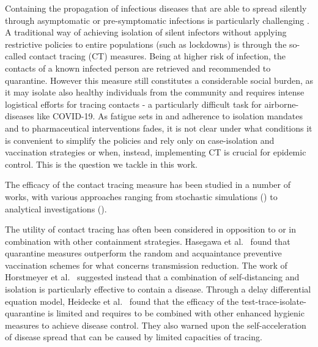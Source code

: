 \documentclass[aps,twocolumn,superscriptaddress,nofootinbib,pre,floatfix]{revtex4-1}
\begin{document}
Containing the propagation of infectious diseases that are able to
spread silently through asymptomatic or pre-symptomatic infections is
particularly challenging \cite{Fraser, Ferretti, Johansson, Li, Groendyke}.
A traditional way of achieving isolation of silent infectors without
applying restrictive policies to entire populations (such as lockdowns)
is through the so-called contact tracing (CT) measures.
Being at higher risk of infection, the contacts of a known infected
person are retrieved and recommended to
quarantine. However this measure still constitutes a considerable
social burden, as it may isolate also healthy individuals from the community and
requires intense logistical efforts for tracing contacts - a
particularly difficult task for airborne-diseases like COVID-19.
As fatigue sets in and adherence to isolation mandates and to
pharmaceutical interventions fades, it is not clear under what
conditions it is convenient to simplify the policies and rely only
on case-isolation and vaccination strategies or when, instead,
implementing CT is crucial for epidemic control.
This is the question we tackle in this work.

The efficacy of the contact tracing measure
has been studied in a number of works, with various approaches ranging
from stochastic simulations (\cite{Mancastroppa21, Kerr, Burdinski, Groendyke, Hellewelllancet, Hasegawa, Horstmeyer}) to analytical investigations
(\cite{Lee,Heidecke, House, ReynaLara, Bianconi, kojaku21, Burgio, Rizi}).

The utility of contact tracing has often been considered in opposition
to or in combination with other containment strategies.  Hasegawa et
al.~\cite{Hasegawa} found that quarantine measures outperform the
random and acquaintance preventive vaccination schemes for what
concerns transmission reduction.  The work of Horstmeyer et
al.~\cite{Horstmeyer} suggested instead that a combination of
self-distancing and isolation is particularly effective to contain a
disease.
Through a delay differential equation model,
Heidecke et al.~\cite{Heidecke} found that the efficacy of the
test-trace-isolate-quarantine is limited and requires to be combined
with other enhanced hygienic measures to achieve disease control. They also
warned upon the self-acceleration of disease spread that can be caused
by limited capacities of tracing.
\end{document}
